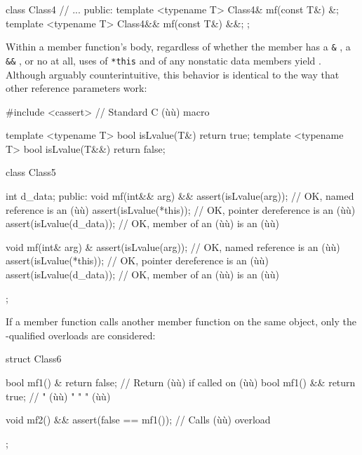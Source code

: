 \begin{emcppslisting}
class Class4
{
    // ...
public:
    template <typename T> Class4&  mf(const T&) &;
    template <typename T> Class4&& mf(const T&) &&;
};
\end{emcppslisting}
    

\noindent Within a member function's body, regardless of whether the member has a
\lstinline!&! , a \lstinline!&&!
, or no  at all, uses of
\lstinline!*this! and of any nonstatic data members yield .
Although arguably counterintuitive, this behavior is identical to the
way that other reference parameters work:

\begin{emcppslisting}
#include <cassert>  // Standard C (ù{}ù) macro

template <typename T> bool isLvalue(T&)  { return true; }
template <typename T> bool isLvalue(T&&) { return false; }

class Class5
{
    int d_data;
public:
    void mf(int&& arg) &&
    {
        assert(isLvalue(arg));     // OK, named reference is an (ù{}ù)
        assert(isLvalue(*this));   // OK, pointer dereference is an (ù{}ù)
        assert(isLvalue(d_data));  // OK, member of an (ù{}ù) is an (ù{}ù)
    }

    void mf(int& arg) &
    {
        assert(isLvalue(arg));     // OK, named reference is an (ù{}ù)
        assert(isLvalue(*this));   // OK, pointer dereference is an (ù{}ù)
        assert(isLvalue(d_data));  // OK, member of an (ù{}ù) is an (ù{}ù)
    }
};
\end{emcppslisting}
    

\noindent If a member function calls another member function on the same object,
only the -qualified overloads are considered:

\begin{emcppslisting}
struct Class6
{
    bool mf1() &  { return false; }  // Return (ù{}ù) if called on (ù{}ù)
    bool mf1() && { return true; }   //    "   (ù{}ù)   "    "    " (ù{}ù)

    void mf2() && { assert(false == mf1()); }  // Calls (ù{}ù) overload
};
\end{emcppslisting}
    

